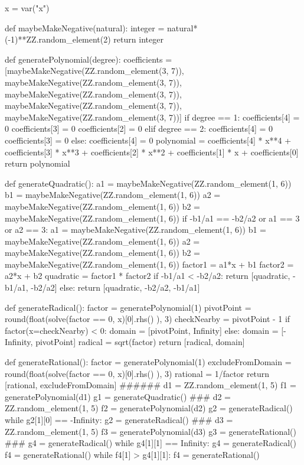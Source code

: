 \documentclass{ximera}
\begin{document}
\begin{sagesilent}
x = var("x")
 
def maybeMakeNegative(natural):
    integer = natural*(-1)**ZZ.random_element(2)
    return integer
 
def generatePolynomial(degree):
    coefficients = [maybeMakeNegative(ZZ.random_element(3, 7)), maybeMakeNegative(ZZ.random_element(3, 7)), maybeMakeNegative(ZZ.random_element(3, 7)), maybeMakeNegative(ZZ.random_element(3, 7)), maybeMakeNegative(ZZ.random_element(3, 7))]
    if degree == 1:
        coefficients[4] = 0
        coefficients[3] = 0
        coefficients[2] = 0
    elif degree == 2:
        coefficients[4] = 0
        coefficients[3] = 0
    else:
        coefficients[4] = 0
    polynomial = coefficients[4] * x**4 + coefficients[3] * x**3 + coefficients[2] * x**2 + coefficients[1] * x + coefficients[0]
    return polynomial
 
def generateQuadratic():
    a1 = maybeMakeNegative(ZZ.random_element(1, 6))
    b1 = maybeMakeNegative(ZZ.random_element(1, 6))
    a2 = maybeMakeNegative(ZZ.random_element(1, 6))
    b2 = maybeMakeNegative(ZZ.random_element(1, 6))
    if -b1/a1 == -b2/a2 or a1 == 3 or a2 == 3:
        a1 = maybeMakeNegative(ZZ.random_element(1, 6))
        b1 = maybeMakeNegative(ZZ.random_element(1, 6))
        a2 = maybeMakeNegative(ZZ.random_element(1, 6))
        b2 = maybeMakeNegative(ZZ.random_element(1, 6))
    factor1 = a1*x + b1
    factor2 = a2*x + b2
    quadratic = factor1 * factor2
    if -b1/a1 < -b2/a2:
        return [quadratic, -b1/a1, -b2/a2]
    else:
        return [quadratic, -b2/a2, -b1/a1]
 
def generateRadical():
    factor = generatePolynomial(1)
    pivotPoint = round(float(solve(factor == 0, x)[0].rhs() ), 3)
    checkNearby = pivotPoint - 1
    if factor(x=checkNearby) < 0:
        domain = [pivotPoint, Infinity]
    else:
        domain = [-Infinity, pivotPoint]
    radical = sqrt(factor)
    return [radical, domain]
 
def generateRational():
    factor = generatePolynomial(1)
    excludeFromDomain = round(float(solve(factor == 0, x)[0].rhs() ), 3)
    rational = 1/factor
    return [rational, excludeFromDomain]
######
d1 = ZZ.random_element(1, 5)
f1 = generatePolynomial(d1)
g1 = generateQuadratic()
###
d2 = ZZ.random_element(1, 5)
f2 = generatePolynomial(d2)
g2 = generateRadical()
while g2[1][0] == -Infinity:
    g2 = generateRadical()
###
d3 = ZZ.random_element(1, 5)
f3 = generatePolynomial(d3)
g3 = generateRational()
###
g4 = generateRadical()
while g4[1][1] == Infinity:
    g4 = generateRadical()
f4 = generateRational()
while f4[1] > g4[1][1]:
    f4 = generateRational()
\end{sagesilent}
 
\end{document}

